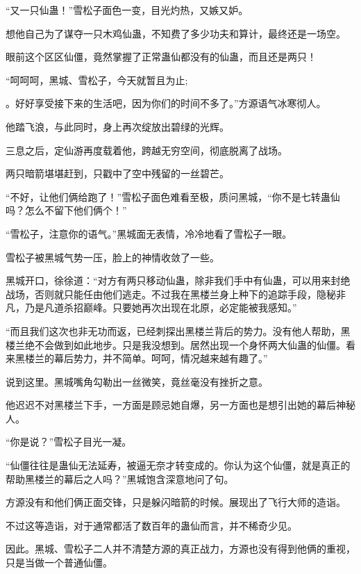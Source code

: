 
\begin{this_body}

“又一只仙蛊！”雪松子面色一变，目光灼热，又嫉又妒。

想他自己为了谋夺一只木鸡仙蛊，不知费了多少功夫和算计，最终还是一场空。

眼前这个区区仙僵，竟然掌握了正常蛊仙都没有的仙蛊，而且还是两只！

“呵呵呵，黑城、雪松子，今天就暂且为止;

。好好享受接下来的生活吧，因为你们的时间不多了。”方源语气冰寒彻人。

他踏飞浪，与此同时，身上再次绽放出碧绿的光辉。

三息之后，定仙游再度载着他，跨越无穷空间，彻底脱离了战场。

两只暗箭堪堪赶到，只戳中了空中残留的一丝碧芒。

“不好，让他们俩给跑了！”雪松子面色难看至极，质问黑城，“你不是七转蛊仙吗？怎么不留下他们俩个！”

“雪松子，注意你的语气。”黑城面无表情，冷冷地看了雪松子一眼。

雪松子被黑城气势一压，脸上的神情收敛了一些。

黑城开口，徐徐道：“对方有两只移动仙蛊，除非我们手中有仙蛊，可以用来封绝战场，否则就只能任由他们逃走。不过我在黑楼兰身上种下的追踪手段，隐秘非凡，乃是凡道杀招巅峰。只要她再次出现在北原，必定能被我感知。”

“而且我们这次也非无功而返，已经刺探出黑楼兰背后的势力。没有他人帮助，黑楼兰绝不会做到如此地步。只是我没想到。居然出现一个身怀两大仙蛊的仙僵。看来黑楼兰的幕后势力，并不简单。呵呵，情况越来越有趣了。”

说到这里。黑城嘴角勾勒出一丝微笑，竟丝毫没有挫折之意。

他迟迟不对黑楼兰下手，一方面是顾忌她自爆，另一方面也是想引出她的幕后神秘人。

“你是说？”雪松子目光一凝。

“仙僵往往是蛊仙无法延寿，被逼无奈才转变成的。你认为这个仙僵，就是真正的帮助黑楼兰的幕后之人吗？”黑城饱含深意地问了句。

方源没有和他们俩正面交锋，只是躲闪暗箭的时候。展现出了飞行大师的造诣。

不过这等造诣，对于通常都活了数百年的蛊仙而言，并不稀奇少见。

因此。黑城、雪松子二人并不清楚方源的真正战力，方源也没有得到他俩的重视，只是当做一个普通仙僵。


\end{this_body}
